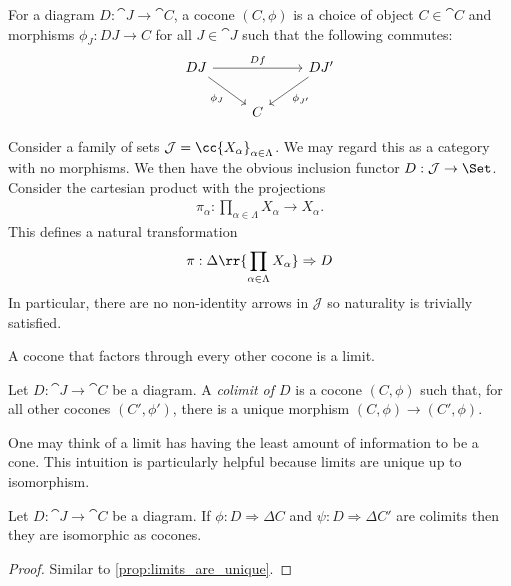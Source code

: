 \documentclass{article}
\begin{document}
For a diagram $D:\cat{J}\to\cat{C}$, a cocone $(C,\phi)$ is a choice of object
$C\in\cat{C}$ and morphisms $\phi_J:DJ\to C$ for all $J\in\cat{J}$ such that
the following commutes:
\begin{equation}
  \begin{tikzcd}
    DJ && {DJ'} \\
       & C
       \arrow["Df", from=1-1, to=1-3]
       \arrow["{\phi_{J'}}", from=1-3, to=2-2]
       \arrow["{\phi_J}"', from=1-1, to=2-2]
  \end{tikzcd}
\end{equation}

\begin{example}
  Consider a family of sets $\mathcal J=\cc{X_\alpha}_{\alpha\in\Lambda}$. We may
  regard this as a category with no morphisms. We then have
  the obvious inclusion functor $D:\mathcal J\to\Set$. Consider the cartesian
  product with the projections
  \begin{align*}
    \pi_\alpha : \prod_{\alpha\in\Lambda} X_\alpha \to X_\alpha.
  \end{align*}
  This defines a natural transformation
  \begin{align*}
    \pi : \Delta\rr{\prod_{\alpha\in\Lambda} X_\alpha}\Rightarrow D
  \end{align*}
  In particular, there are no non-identity arrows in $\mathcal J$ so
  naturality is trivially satisfied.
\end{example}

A cocone that factors through every other cocone is a limit.

\begin{definition}
  Let $D:\cat{J}\to\cat{C}$ be a diagram. A \emph{colimit of $D$} is a cocone
  $(C,\phi)$ such that, for all other cocones $(C',\phi')$, there is a unique morphism
  $(C,\phi)\to(C',\phi)$.
\end{definition}

One may think of a limit has having the least amount of information to be a cone.
This intuition is particularly helpful because limits are unique up to isomorphism.

\begin{proposition}
  Let $D:\cat{J}\to\cat{C}$ be a diagram. If $\phi:D\Rightarrow\Delta C$
  and $\psi:D\Rightarrow\Delta C'$ are colimits then they are isomorphic as cocones.
  \begin{proof}
    Similar to \ref{prop:limits_are_unique}.
  \end{proof}
\end{proposition}
\end{document}
